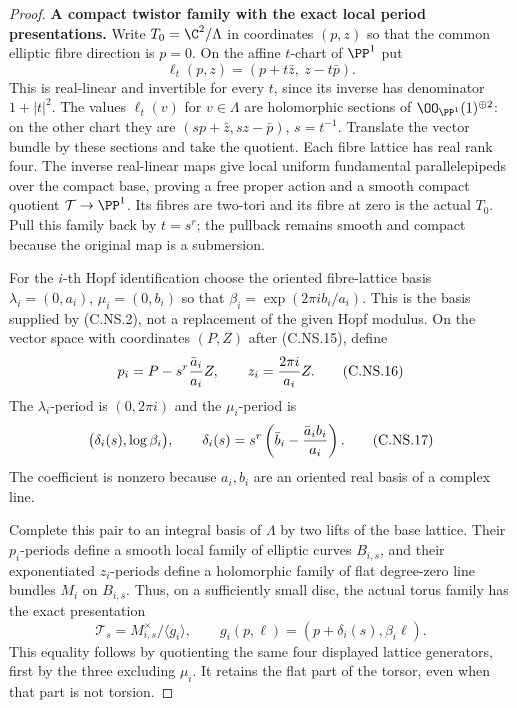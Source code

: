 \begin{proof}
\par\medskip\noindent\textbf{A compact twistor family with the exact local period presentations.}
Write $T_0=\C^2/\Lambda$ in coordinates $(p,z)$
so that the common elliptic fibre direction is
$p=0$. On the affine $t$-chart of $\PP^1$ put
\[
 \ell_t(p,z)=(p+t\bar z,\ z-t\bar p).
                                                        \tag{C.NS.15}
\]
This is real-linear and invertible for every
$t$, since its inverse has denominator
$1+|t|^2$. The values $\ell_t(v)$ for
$v\in\Lambda$ are holomorphic sections of
$\OO_{\PP^1}(1)^{\oplus2}$: on the other chart
they are $(s p+\bar z,s z-\bar p)$, $s=t^{-1}$.
Translate the vector bundle by these sections
and take the quotient. Each fibre lattice has
real rank four. The inverse real-linear maps
give local uniform fundamental parallelepipeds
over the compact base, proving a free proper
action and a smooth compact quotient
$\mathcal T\to\PP^1$. Its fibres are two-tori
and its fibre at zero is the actual $T_0$.
Pull this family back by $t=s^r$; the pullback
remains smooth and compact because the
original map is a submersion.

For the $i$-th Hopf identification choose the
oriented fibre-lattice basis
$\lambda_i=(0,a_i)$, $\mu_i=(0,b_i)$ so that
$\beta_i=\exp(2\pi i b_i/a_i)$. This is the
basis supplied by (C.NS.2), not a replacement
of the given Hopf modulus. On the vector
space with coordinates $(P,Z)$ after
(C.NS.15), define
\[
 p_i=P-s^r{\bar a_i\over a_i}Z,\qquad
 z_i={2\pi i\over a_i}Z.
                                                        \tag{C.NS.16}
\]
The $\lambda_i$-period is $(0,2\pi i)$ and
the $\mu_i$-period is
\[
   \bigl(\delta_i(s),\log\beta_i\bigr),\qquad
   \delta_i(s)=s^r
        \left(\bar b_i-{\bar a_i b_i\over a_i}\right).
                                                        \tag{C.NS.17}
\]
The coefficient is nonzero because $a_i,b_i$
are an oriented real basis of a complex line.

Complete this pair to an integral basis of
$\Lambda$ by two lifts of the base lattice.
Their $p_i$-periods define a smooth local
family of elliptic curves $B_{i,s}$, and
their exponentiated $z_i$-periods define a
holomorphic family of flat degree-zero line
bundles $M_i$ on $B_{i,s}$. Thus, on a
sufficiently small disc, the actual torus
family has the exact presentation
\[
 \mathcal T_s
   =M_{i,s}^{\times}/\langle g_i\rangle,\qquad
 g_i(p,\ell)=(p+\delta_i(s),\beta_i\ell).
                                                        \tag{C.NS.18}
\]
This equality follows by quotienting the
same four displayed lattice generators,
first by the three excluding $\mu_i$.
It retains the flat part of the torsor,
even when that part is not torsion.


\end{proof}
